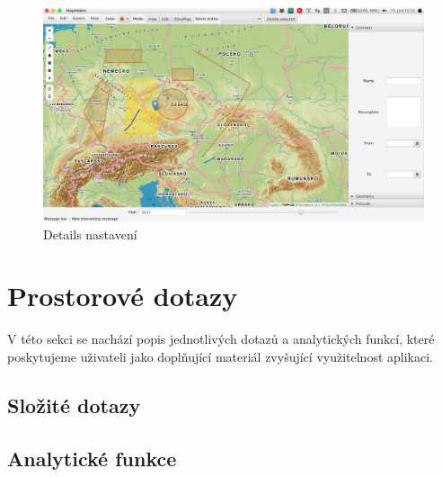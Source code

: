 \documentclass[12pt,a4paper,titlepage]{article}
\begin{document}
\begin{figure}[!htbp]
	\centering
	\includegraphics[scale=0.25]{full_window}
	\caption{Details nastavení}
	\label{settings}
\end{figure}

\section{Prostorové dotazy}
V této sekci se nachází popis jednotlivých dotazů a analytických funkcí, které poskytujeme uživateli jako doplňující materiál zvyšující využitelnost aplikaci.

\subsection{Složité dotazy}

\subsection{Analytické funkce}
\end{document}
